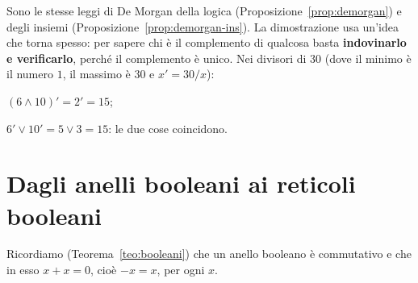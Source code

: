 \begin{spiegazione}
    Sono le stesse leggi di De Morgan della logica (Proposizione~\ref{prop:demorgan}) e degli insiemi (Proposizione~\ref{prop:demorgan-ins}). La dimostrazione usa
    un'idea che torna spesso: per sapere chi è il complemento di qualcosa basta \textbf{indovinarlo e verificarlo}, perché il complemento è unico.
    Nei divisori di $30$ (dove il minimo è il numero $1$, il massimo è $30$ e $x' = 30/x$):
    \begin{passi}
        \item $(6 \wedge 10)' = 2' = 15$;
        \item $6' \vee 10' = 5 \vee 3 = 15$: le due cose coincidono.
    \end{passi}
\end{spiegazione}

\section{Dagli anelli booleani ai reticoli booleani}\label{sec:anelli-reticoli}

Ricordiamo (Teorema~\ref{teo:booleani}) che un anello booleano è commutativo e che in esso $x + x = 0$, cioè $-x = x$, per ogni $x$.


